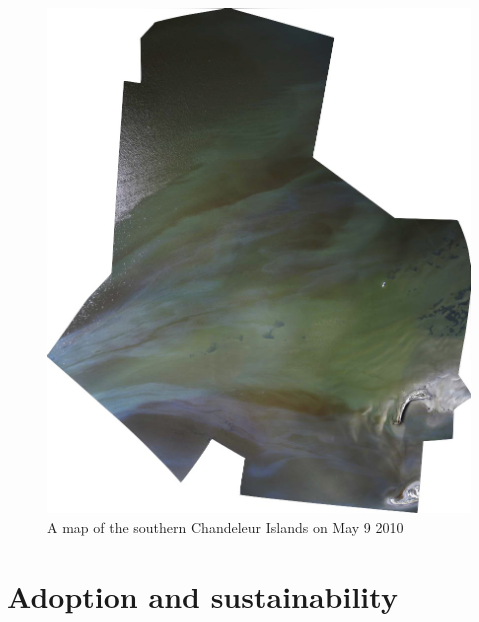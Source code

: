 \documentclass[11pt,oneside,notitlepage]{report}
\begin{document}
{{\begin{figure}[p]
  \begin{center}
	\includegraphics[width=1\textwidth]{images/chandeleur-island.jpg}
	\caption{A map of the southern Chandeleur Islands on May 9 2010}
  \end{center}
\end{figure}

\section{Adoption and sustainability}


}}
\end{document}
